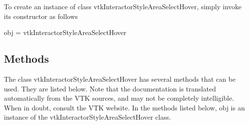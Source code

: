 To create an instance of class vtk\-Interactor\-Style\-Area\-Select\-Hover, simply invoke its constructor as follows \begin{DoxyVerb}  obj = vtkInteractorStyleAreaSelectHover
\end{DoxyVerb}
 \hypertarget{vtkwidgets_vtkxyplotwidget_Methods}{}\subsection{Methods}\label{vtkwidgets_vtkxyplotwidget_Methods}
The class vtk\-Interactor\-Style\-Area\-Select\-Hover has several methods that can be used. They are listed below. Note that the documentation is translated automatically from the V\-T\-K sources, and may not be completely intelligible. When in doubt, consult the V\-T\-K website. In the methods listed below, {\ttfamily obj} is an instance of the vtk\-Interactor\-Style\-Area\-Select\-Hover class. 
